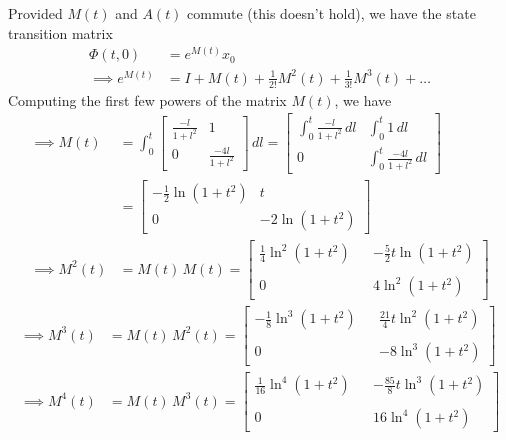 \vspace*{3em}
Provided \( M(t) \) and \( A(t) \) commute
(this doesn't hold), we have the state transition matrix
\begin{align*}
    \Phi(t, 0)
     & =
    e^{M(t)} x_0
    \\
    \implies
    e^{M(t)}
     & =
    I + M(t) + \frac{1}{2!} M^2(t) + \frac{1}{3!} M^3(t) + \ldots
\end{align*}
Computing the first few powers of the matrix \( M(t) \), we have
\begin{align*}
    \implies
    M(t)
     & =
    \int_{0}^{t}
    \begin{bmatrix}
        \frac{-l}{1+l^2} & 1                 \\
        0                & \frac{-4l}{1+l^2}
    \end{bmatrix}
    \, dl
    =
    \begin{bmatrix}
        \int_{0}^{t} \frac{-l}{1+l^2} \, dl
         &
        \int_{0}^{t} 1 \, dl
        \\
        0
         &
        \int_{0}^{t} \frac{-4l}{1+l^2} \, dl
    \end{bmatrix}
    \\ & =
    \begin{bmatrix}
        -\frac{1}{2} \ln(1+t^2)
         &
        t
        \\
        0
         &
        -2 \ln(1+t^2)
    \end{bmatrix}
    \\
    \implies
    M^2(t)
     & =
    M(t) \, M(t)
    =
    \begin{bmatrix}
        \frac{1}{4} \ln^2(1+t^2)
         &  &
        -\frac{5}{2} t \ln(1+t^2)
        \\ \\
        0
         &  &
        4 \ln^2(1+t^2)
    \end{bmatrix}
\end{align*}
\begin{align*}
    \implies
    M^3(t)
     & =
    M(t) \, M^2(t)
    =
    \begin{bmatrix}
        -\frac{1}{8} \ln^3(1+t^2)
         &  &
        \frac{21}{4} t \ln^2(1+t^2)
        \\ \\
        0
         &  &
        -8 \ln^3(1+t^2)
    \end{bmatrix}
    \\
    \implies
    M^4(t)
     & =
    M(t) \, M^3(t)
    =
    \begin{bmatrix}
        \frac{1}{16} \ln^4(1+t^2)
         &  &
        -\frac{85}{8} t \ln^3(1+t^2)
        \\ \\
        0
         &  &
        16 \ln^4(1+t^2)
    \end{bmatrix}
\end{align*}

